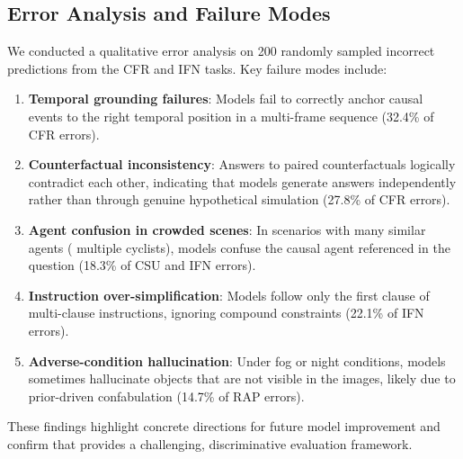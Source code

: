 \subsection{Error Analysis and Failure Modes}
\label{ssec:exp_errors}

We conducted a qualitative error analysis on 200 randomly sampled incorrect
predictions from the CFR and IFN tasks. Key failure modes include:

\begin{enumerate}[leftmargin=2em, noitemsep]
  \item \textbf{Temporal grounding failures}: Models fail to correctly anchor causal
        events to the right temporal position in a multi-frame sequence (32.4\% of
        CFR errors).
  \item \textbf{Counterfactual inconsistency}: Answers to paired counterfactuals
        logically contradict each other, indicating that models generate answers
        independently rather than through genuine hypothetical simulation (27.8\% of
        CFR errors).
  \item \textbf{Agent confusion in crowded scenes}: In scenarios with many similar
        agents (\eg{} multiple cyclists), models confuse the causal agent referenced
        in the question (18.3\% of CSU and IFN errors).
  \item \textbf{Instruction over-simplification}: Models follow only the first clause
        of multi-clause instructions, ignoring compound constraints (22.1\% of IFN
        errors).
  \item \textbf{Adverse-condition hallucination}: Under fog or night conditions,
        models sometimes hallucinate objects that are not visible in the images,
        likely due to prior-driven confabulation (14.7\% of RAP errors).
\end{enumerate}

These findings highlight concrete directions for future model improvement and
confirm that \lucid{} provides a challenging, discriminative evaluation framework.
